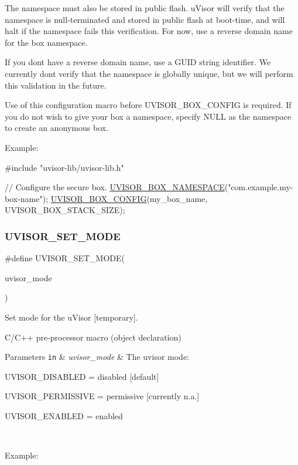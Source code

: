 The namespace must also be stored in public flash. u\+Visor will verify that the namespace is null-\/terminated and stored in public flash at boot-\/time, and will halt if the namespace fails this verification. For now, use a reverse domain name for the box namespace.

If you don\textquotesingle{}t have a reverse domain name, use a G\+U\+ID string identifier. We currently don\textquotesingle{}t verify that the namespace is globally unique, but we will perform this validation in the future.

Use of this configuration macro before U\+V\+I\+S\+O\+R\+\_\+\+B\+O\+X\+\_\+\+C\+O\+N\+F\+IG is required. If you do not wish to give your box a namespace, specify N\+U\+LL as the namespace to create an anonymous box.

Example\+: 
\begin{DoxyCode}
\textcolor{preprocessor}{#include "uvisor-lib/uvisor-lib.h"}

\textcolor{comment}{// Configure the secure box.}
\hyperlink{group__hypervisor_gafe52bfcc466d459d149c63966c2f4a58}{UVISOR\_BOX\_NAMESPACE}(\textcolor{stringliteral}{"com.example.my-box-name"});
\hyperlink{group__hypervisor_ga6143739a0475a71e8002f540de3c53f0}{UVISOR\_BOX\_CONFIG}(my\_box\_name, UVISOR\_BOX\_STACK\_SIZE); 
\end{DoxyCode}
 \hypertarget{group__hypervisor_ga7cb080278fc7d660addf9bbff6d3f2da}{}\label{group__hypervisor_ga7cb080278fc7d660addf9bbff6d3f2da} 
\subsubsection{\texorpdfstring{U\+V\+I\+S\+O\+R\+\_\+\+S\+E\+T\+\_\+\+M\+O\+DE}{UVISOR\_SET\_MODE}}
{\footnotesize\ttfamily \#define U\+V\+I\+S\+O\+R\+\_\+\+S\+E\+T\+\_\+\+M\+O\+DE(\begin{DoxyParamCaption}\item[{}]{uvisor\+\_\+mode }\end{DoxyParamCaption})}



Set mode for the u\+Visor \mbox{[}temporary\mbox{]}. 

C/\+C++ pre-\/processor macro (object declaration)


\begin{DoxyParams}[1]{Parameters}
\mbox{\tt in}  & {\em uvisor\+\_\+mode} & The uvisor mode\+:
\begin{DoxyItemize}
\item U\+V\+I\+S\+O\+R\+\_\+\+D\+I\+S\+A\+B\+L\+ED = disabled \mbox{[}default\mbox{]}
\item U\+V\+I\+S\+O\+R\+\_\+\+P\+E\+R\+M\+I\+S\+S\+I\+VE = permissive \mbox{[}currently n.\+a.\mbox{]}
\item U\+V\+I\+S\+O\+R\+\_\+\+E\+N\+A\+B\+L\+ED = enabled
\end{DoxyItemize}\\
\hline
\end{DoxyParams}
Example\+:


